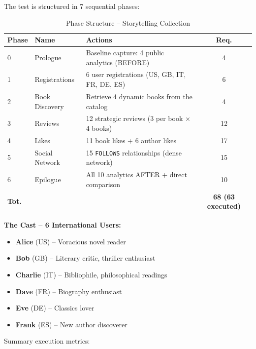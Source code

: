 The test is structured in 7 sequential phases:

\begin{table}[H]
    \centering
    \caption{Phase Structure -- Storytelling Collection}
    \label{tab:postman_phases}
    \begin{tabular}{@{}p{}p{}p{}c@{}}
        \toprule
        \textbf{Phase} & \textbf{Name} & \textbf{Actions} & \textbf{Req.} \\ \midrule
        0 & Prologue & Baseline capture: 4 public analytics (BEFORE) & 4 \\
        1 & Registrations & 6 user registrations (US, GB, IT, FR, DE, ES) & 6 \\
        2 & Book Discovery & Retrieve 4 dynamic books from the catalog & 4 \\
        3 & Reviews & 12 strategic reviews (3 per book $\times$ 4 books) & 12 \\
        4 & Likes & 11 book likes + 6 author likes & 17 \\
        5 & Social Network & 15 \texttt{FOLLOWS} relationships (dense network) & 15 \\
        6 & Epilogue & All 10 analytics AFTER + direct comparison & 10 \\
        \midrule
        \textbf{Tot.} & & & \textbf{68 (63 executed)} \\
        \bottomrule
    \end{tabular}
\end{table}

\textbf{The Cast -- 6 International Users:}
\begin{itemize}
    \item \textbf{Alice} (US) -- Voracious novel reader
    \item \textbf{Bob} (GB) -- Literary critic, thriller enthusiast
    \item \textbf{Charlie} (IT) -- Bibliophile, philosophical readings
    \item \textbf{Dave} (FR) -- Biography enthusiast
    \item \textbf{Eve} (DE) -- Classics lover
    \item \textbf{Frank} (ES) -- New author discoverer
\end{itemize}

Summary execution metrics:


